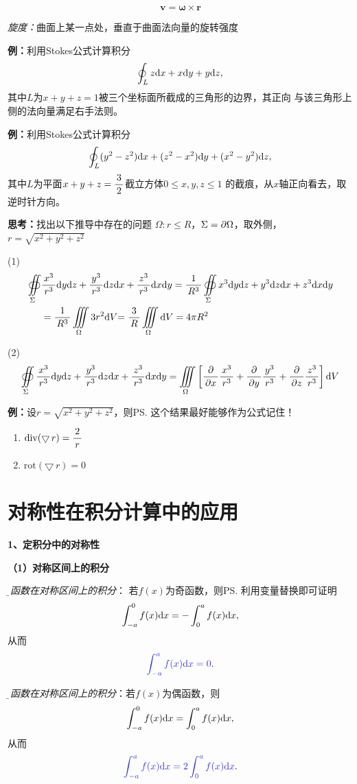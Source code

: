 $${\bm{v}=\bm{\omega}\times\bm{r}}$$

{\it 旋度：}曲面上某一点处，垂直于曲面法向量的旋转强度

{\bf 例：}利用Stokes公式计算积分
$$\oint_Lz\d x+x\d y+y\d z,$$
其中$L$为$x+y+z=1$被三个坐标面所截成的三角形的边界，其正向
与该三角形上侧的法向量满足右手法则。

{\bf 例：}利用Stokes公式计算积分
$$\oint_L(y^2-z^2)\d x+(z^2-x^2)\d y+(x^2-y^2)\d z,$$
其中$L$为平面$x+y+z=\df 32$截立方体$0\leq x,y,z\leq 1$
的截痕，从$x$轴正向看去，取逆时针方向。

{\bf 思考：}找出以下推导中存在的问题
$\Omega:r\leq R$，$\Sigma=\p\Omega$，取外侧，
$r=\sqrt{x^2+y^2+z^2}$

(1)
\begin{align*}
	\ds\oiint\limits_{\Sigma}&\df{x^3}{r^3}\d
  	y\d z+\df{y^3}{r^3}\d z\d x+\df{z^3}{r^3}\d x\d y
  	=\df 1{R^3}\oiint\limits_{\Sigma}x^3\d y\d z+y^3\d z\d x+z^3\d
  	x\d y\\
  	&=\df 1{R^3}\iiint\limits_{\Omega}3r^2\d V{=\df
  3R\iiint\limits_{\Omega}\d V} =4\pi R^2
\end{align*}

(2)
$$\ds\oiint\limits_{\Sigma}\df{x^3}{r^3}\d
  	y\d z+\df{y^3}{r^3}\d z\d x+\df{z^3}{r^3}\d x\d y
  	=\ds\iiint\limits_{\Omega}\left[\df{\p}{\p x}\df{x^3}{r^3}+\df{\p}{\p
  	y}\df{y^3}{r^3}+\df{\p}{\p z}\df{z^3}{r^3}\right]\d V$$

{\bf 例：}设$r=\sqrt{x^2+y^2+z^2}$，则\ps{这个结果最好能够作为公式记住！}
\begin{enumerate}[(1)]
  \setlength{\itemindent}{1cm}
  \item $\mathrm{div}(\bigtriangledown\,r)=\df 2r$
  \item $\mathrm{rot}(\bigtriangledown\,r)=0$
\end{enumerate}

\newpage

\section{对称性在积分计算中的应用}

\bigskip

{\bf 1、定积分中的对称性}

{\bf （1）对称区间上的积分}

{\it\b 奇函数在对称区间上的积分}：
若$f(x)$为奇函数，则\ps{利用变量替换即可证明}
$$\int_{-a}^0f(x)\d x=-\int_0^af(x)\d x,$$
从而
$${\b \int_{-a}^af(x)\d x=0}.$$

{\it\b 偶函数在对称区间上的积分}：若$f(x)$为偶函数，则
$$\int_{-a}^0f(x)\d x=\int_0^af(x)\d x,$$
从而
$${\b \int_{-a}^af(x)\d x=2\int_0^af(x)\d x}.$$

